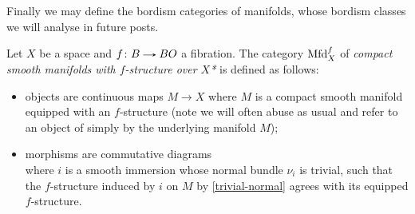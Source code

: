 Finally we may define the bordism categories of manifolds, whose
bordism classes we will analyse in future posts.

\begin{definition}
  Let $X$ be a space and $f \c B \to BO$ a fibration. The category
  $\mathrm{Mfd}^f_X$ of \emph{compact smooth manifolds with $f$-structure
    over $X$*} is defined as follows:
  \begin{itemize}
  \item objects are continuous maps $M \to X$ where $M$ is a compact
    smooth manifold equipped with an $f$-structure (note we will often
    abuse as usual and refer to an object of simply by the underlying
    manifold $M$);
  \item morphisms are commutative diagrams
    \[
    \]
    where $i$ is a smooth immersion whose normal bundle $\nu_i$ is
    trivial, such that the $f$-structure induced by $i$ on $M$ by
    \eqref{trivial-normal} agrees with its equipped $f$-structure.
  \end{itemize}


\end{definition}
